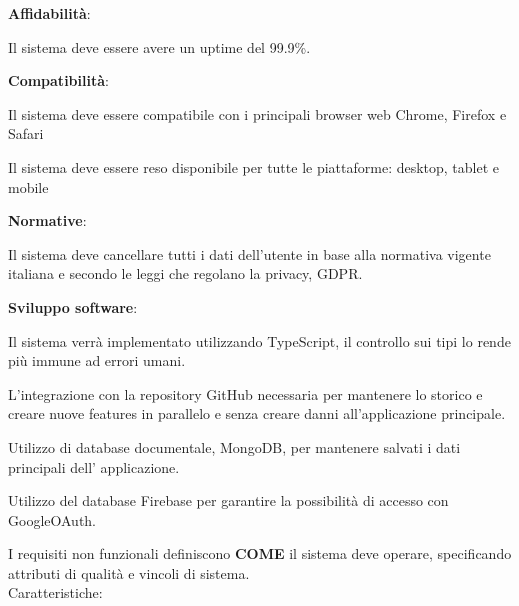 \begin{rnfenum}
    \item \textbf{Affidabilità}:
        \begin{rnfenum}
            \item Il sistema deve essere avere un uptime del 99.9\%.
        \end{rnfenum}

    \item \textbf{Compatibilità}:
        \begin{rnfenum}
            \item Il sistema deve essere compatibile con i principali browser web Chrome, Firefox e Safari
            \item Il sistema deve essere reso disponibile per tutte le piattaforme: desktop, tablet e mobile
        \end{rnfenum}       

    \item \textbf{Normative}:
        \begin{rnfenum}
            \item Il sistema deve cancellare tutti i dati dell'utente in base alla normativa vigente italiana e secondo le leggi che regolano la privacy, GDPR.
        \end{rnfenum}

    \item \textbf{Sviluppo software}:
        \begin{rnfenum}
            \item Il sistema verrà implementato utilizzando TypeScript, il controllo sui tipi lo rende più immune ad errori umani.
            \item L'integrazione con la repository GitHub necessaria per mantenere lo storico e creare nuove features in parallelo e senza creare danni all'applicazione principale.
            \item Utilizzo di database documentale, MongoDB, per mantenere salvati i dati principali dell' applicazione.
            \item Utilizzo del database Firebase per garantire la possibilità di accesso con GoogleOAuth.
        \end{rnfenum}
    
    
\end{rnfenum}

\newpage
I requisiti non funzionali definiscono \textbf{COME} il sistema deve operare, specificando attributi di qualità e vincoli di sistema.\\
Caratteristiche:

